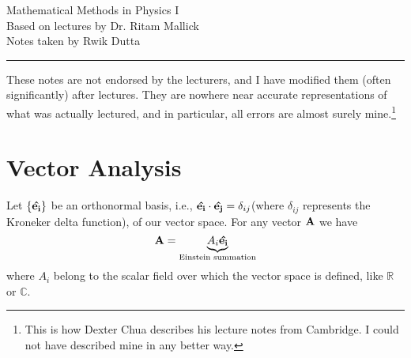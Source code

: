 \documentclass[10pt, a4paper]{extarticle}
\theoremstyle{definition}
\numberwithin{equation}{subsection}
\begin{document}
\begin{center}
	\fontsize{25}{60}\selectfont Mathematical Methods in Physics I \\
	\large Based on lectures by Dr. Ritam Mallick\\
	Notes taken by Rwik Dutta
\end{center}
\hrule
\begin{center}
	These notes are not endorsed by the lecturers, and I have modified them (often
	significantly) after lectures. They are nowhere near accurate representations of what
	was actually lectured, and in particular, all errors are almost surely mine.\footnote[1]{This is how Dexter Chua describes his lecture notes from Cambridge. I could not have described mine in any better way.}
\end{center}
\tableofcontents

\newpage

\section{Vector Analysis}
Let $\{\vu{e_i}\}$ be an orthonormal basis, i.e., $\vu{e_i}\cdot\vu{e_j}=\delta_{ij}$(where $\delta_{ij}$ represents the Kroneker delta function), of our vector space. For any vector $\vb{A}$ we have
\begin{equation}\vb{A}=\underbrace{A_i\vu{e_i}}_{\text{Einstein summation}}\end{equation}
where $A_i$ belong to the scalar field over which the vector space is defined, like $\mathbb{R}$ or $\mathbb{C}$.
\end{document}
